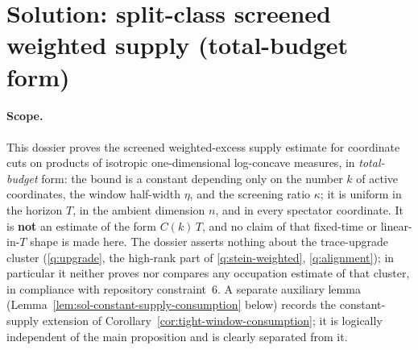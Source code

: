 \documentclass[../main.tex]{subfiles}
\begin{document}
%
\section*{Solution: split-class screened weighted supply (total-budget form)}
\label{sec:sol-split-screened-supply}

\paragraph{Scope.}
This dossier proves the screened weighted-excess supply estimate for coordinate cuts on
products of isotropic one-dimensional log-concave measures, in \emph{total-budget} form: the
bound is a constant depending only on the number $k$ of active coordinates, the window
half-width $\eta$, and the screening ratio $\kappa$; it is uniform in the horizon $T$, in the
ambient dimension $n$, and in every spectator coordinate.  It is \textbf{not} an estimate of
the form $C(k)\,T$, and no claim of that fixed-time or linear-in-$T$ shape is made here.  The
dossier asserts nothing about the trace-upgrade cluster
(\ref{q:upgrade}, the high-rank part of \ref{q:stein-weighted}, \ref{q:alignment}); in
particular it neither proves nor compares any occupation estimate of that cluster, in
compliance with repository constraint~6.  A separate auxiliary lemma
(Lemma~\ref{lem:sol-constant-supply-consumption} below) records the constant-supply extension
of Corollary~\ref{cor:tight-window-consumption}; it is logically independent of the main
proposition and is clearly separated from it.
\end{document}
